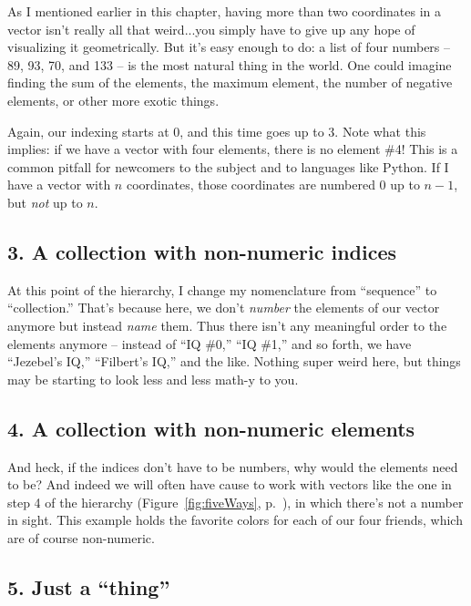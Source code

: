 As I mentioned earlier in this chapter, having more than two coordinates in a
vector isn't really all that weird...you simply have to give up any hope of
visualizing it geometrically. But it's easy enough to do: a list of four
numbers -- 89, 93, 70, and 133 -- is the most natural thing in the world. One
could imagine finding the sum of the elements, the maximum element, the number
of negative elements, or other more exotic things.

Again, our indexing starts at 0, and this time goes up to 3. Note what this
implies: if we have a vector with four elements, there is no element \#4! This
is a common pitfall for newcomers to the subject and to languages like Python.
If I have a vector with $n$ coordinates, those coordinates are numbered 0 up to 
$n-1$, but \textit{not} up to $n$.

\subsection{3. A collection with non-numeric indices}

At this point of the hierarchy, I change my nomenclature from ``sequence'' to
``collection.'' That's because here, we don't \textit{number} the elements of
our vector anymore but instead \textit{name} them. Thus there isn't any
meaningful order to the elements anymore -- instead of ``IQ \#0,'' ``IQ \#1,''
and so forth, we have ``Jezebel's IQ,'' ``Filbert's IQ,'' and the like. Nothing
super weird here, but things may be starting to look less and less math-y to
you.


\subsection{4. A collection with non-numeric elements}

And heck, if the indices don't have to be numbers, why would the elements need
to be? And indeed we will often have cause to work with vectors like the one in
step 4 of the hierarchy (Figure~\ref{fig:fiveWays}, p.~\pageref{fig:fiveWays}),
in which there's not a number in sight. This example holds the favorite colors
for each of our four friends, which are of course non-numeric.

\subsection{5. Just a ``thing''}

